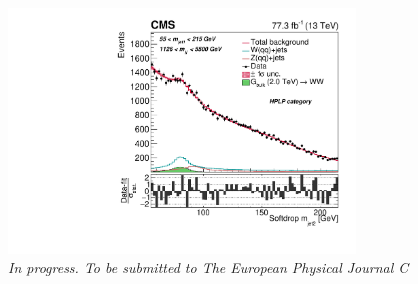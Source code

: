 \begin{figure}[b!]
    \centering
    \includegraphics[height=6.5cm]{figures/analysis/search3/B2G-18-002/PostFitComboHPLP_Y-Proj__x___0_-1_z___0_-1.pdf}
    \vspace*{10mm}
    \caption*{\footnotesize{\textit{In progress. To be submitted to The European Physical Journal C}}}
\end{figure}


\clearpage




